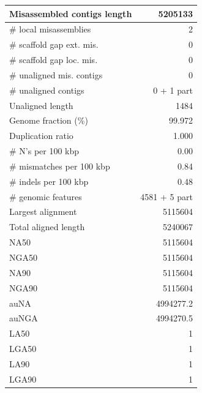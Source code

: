 \documentclass[12pt,a4paper]{article}
\begin{document}
\begin{table}[ht]
\begin{center}
\begin{tabular}{|l*{1}{|r}|}
Misassembled contigs length & 5205133 \\ \hline
\# local misassemblies & 2 \\ \hline
\# scaffold gap ext. mis. & 0 \\ \hline
\# scaffold gap loc. mis. & 0 \\ \hline
\# unaligned mis. contigs & 0 \\ \hline
\# unaligned contigs & 0 + 1 part \\ \hline
Unaligned length & 1484 \\ \hline
Genome fraction (\%) & 99.972 \\ \hline
Duplication ratio & 1.000 \\ \hline
\# N's per 100 kbp & 0.00 \\ \hline
\# mismatches per 100 kbp & 0.84 \\ \hline
\# indels per 100 kbp & 0.48 \\ \hline
\# genomic features & 4581 + 5 part \\ \hline
Largest alignment & 5115604 \\ \hline
Total aligned length & 5240067 \\ \hline
NA50 & 5115604 \\ \hline
NGA50 & 5115604 \\ \hline
NA90 & 5115604 \\ \hline
NGA90 & 5115604 \\ \hline
auNA & 4994277.2 \\ \hline
auNGA & 4994270.5 \\ \hline
LA50 & 1 \\ \hline
LGA50 & 1 \\ \hline
LA90 & 1 \\ \hline
LGA90 & 1 \\ \hline
\end{tabular}
\end{center}
\end{table}
\end{document}
